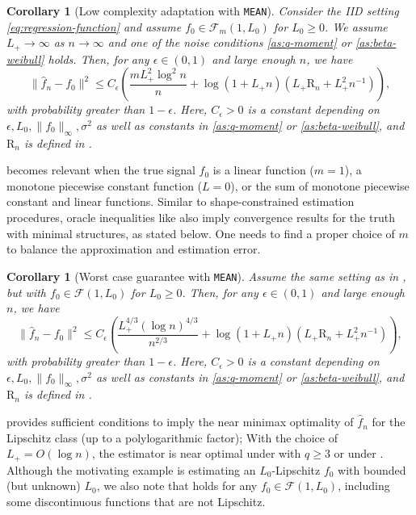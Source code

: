 \documentclass[12pt]{article}
\newtheorem{corollary}[theorem]{Corollary}
\begin{document}
 \begin{corollary}[Low complexity adaptation with \texttt{MEAN}]\label{cor:low-complexity} Consider the IID setting \eqref{eq:regression-function} and assume $f_0 \in \mathcal{F}_m(1, L_0)$ for $L_0 \ge 0$. We assume $L_+\rightarrow \infty$ as $n \rightarrow\infty$ and one of the noise conditions \ref{as:q-moment} or \ref{as:beta-weibull} holds. Then, for any $\epsilon \in(0,1)$ and large enough $n$, we have
\begin{equation*}
\|\widehat{f}_n-f_0\|^2 \leq C_\epsilon\left(\frac{m L_{+}^2 \log ^2 n}{n}+\log \left(1+L_{+} n\right)\left(L_{+} \mathrm{R}_n+L_{+}^2 n^{-1}\right)\right),
\end{equation*}
with probability greater than $1-\epsilon$. Here, $C_\epsilon > 0$ is a constant depending on $\epsilon, L_0, \|f_0\|_\infty, \sigma^2$ as well as constants in \ref{as:q-moment} or \ref{as:beta-weibull}, and $\mathrm{R}_n$ is defined in .
\end{corollary}

 becomes relevant when the true signal $f_0$ is a linear function ($m=1$), a monotone piecewise constant function ($L=0$), or the sum of monotone piecewise constant and linear functions. Similar to shape-constrained estimation procedures, oracle inequalities like 
also imply convergence results for the truth with minimal structures, as stated below. One needs to find a proper choice of $m$ to balance the approximation and estimation error.

\begin{corollary}[Worst case guarantee with \texttt{MEAN}]\label{cor:worst-case} 
Assume the same setting as in , but with $f_0\in\mathcal{F}(1,L_0)$ for $L_0 \ge 0$.
Then, for any $\epsilon\in(0,1)$ and large enough $n$, we have
\begin{equation*}
\|\widehat{f}_n-f_0\|^2 \leq C_\epsilon\left(\frac{L_{+}^{4 / 3}(\log n)^{4 / 3}}{n^{2 / 3}}+\log \left(1+L_{+} n\right)\left(L_{+} \mathrm{R}_n+L_{+}^2 n^{-1}\right)\right),
\end{equation*}
with probability greater than $1-\epsilon$. Here, $C_\epsilon >0$ is a constant depending on $\epsilon, L_0, \|f_0\|_\infty, \sigma^2$ as well as constants in \ref{as:q-moment} or \ref{as:beta-weibull}, and $\mathrm{R}_n$ is defined in .
\end{corollary}

 provides sufficient conditions to imply the near minimax optimality of $\widehat f_n$ for the Lipschitz class (up to a polylogarithmic factor); With the choice of $L_+=O(\log n)$, the estimator is near optimal under  with $q \ge 3$ or under . Although the motivating example is estimating an $L_0$-Lipschitz $f_0$ with bounded (but unknown) $L_0$, we also note that  holds for any $f_0\in\mathcal{F}(1,L_0)$, including some discontinuous functions that are not Lipschitz.
\end{document}
